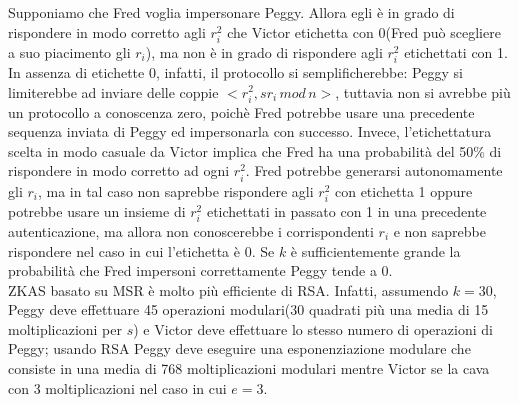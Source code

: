 Supponiamo che Fred voglia impersonare Peggy. Allora egli è in grado di rispondere in modo corretto agli $r_{i}^2$ che Victor etichetta con 0(Fred può scegliere a suo piacimento gli $r_{i}$), ma non è in grado di rispondere agli $r_{i}^2$ etichettati con 1. In assenza di etichette 0, infatti, il protocollo si semplificherebbe: Peggy si limiterebbe ad inviare delle coppie $<r_{i}^2, sr_{i} \, mod \, n>$, tuttavia non si avrebbe più un protocollo a conoscenza zero, poichè Fred potrebbe usare una precedente sequenza inviata di Peggy ed impersonarla con successo. Invece, l'etichettatura scelta in modo casuale da Victor implica che Fred ha una probabilità del 50\% di
rispondere in modo corretto ad ogni $r_{i}^2$. Fred potrebbe generarsi autonomamente gli $r_{i}$, ma in tal caso non saprebbe rispondere agli $r_{i}^2$ con etichetta 1 oppure potrebbe usare un insieme di $r_{i}^2$ etichettati in passato con 1 in una precedente autenticazione, ma allora non conoscerebbe i corrispondenti $r_{i}$ e non saprebbe rispondere nel caso in cui l'etichetta è 0. Se $k$ è sufficientemente grande la probabilità che Fred impersoni correttamente Peggy tende a 0. \\
ZKAS basato su MSR è molto più efficiente di RSA. Infatti, assumendo $k = 30$, Peggy deve effettuare 45 operazioni modulari(30
quadrati più una media di 15 moltiplicazioni per $s$) e Victor deve effettuare lo stesso numero di operazioni di Peggy; usando RSA Peggy deve eseguire una esponenziazione modulare che consiste in una media di 768 moltiplicazioni modulari mentre Victor se la cava con 3 moltiplicazioni nel caso in cui $e = 3$.
